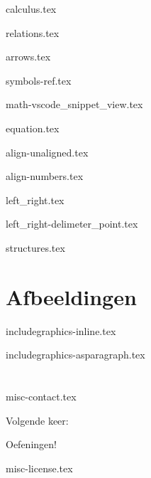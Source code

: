 \documentclass{cursuspresentatie}
\def\importslide#1#2{%
	{#2}
}
\begin{document}
\importslide{math}{calculus.tex}

\importslide{math}{relations.tex}
\importslide{math}{arrows.tex}
\importslide{math}{symbols-ref.tex}

\importslide{math}{math-vscode_snippet_view.tex}

\importslide{math}{equation.tex}

\importslide{math}{align-unaligned.tex}
\importslide{math}{align-numbers.tex}

\importslide{math}{left_right.tex}
\importslide{math}{left_right-delimeter_point.tex}

\importslide{math}{structures.tex}

\section{Afbeeldingen}


\importslide{images}{includegraphics-inline.tex}
\importslide{images}{includegraphics-asparagraph.tex}

\section{\texorpdfstring{}{Misc}}

\importslide{misc}{misc-contact.tex}

\begin{frame}
	Volgende keer:

	\textellipsis
\end{frame}

\begin{frame}
	Oefeningen!
\end{frame}

\ifishandout
	\importslide{misc}{misc-license.tex}
\fi
	
\end{document}
